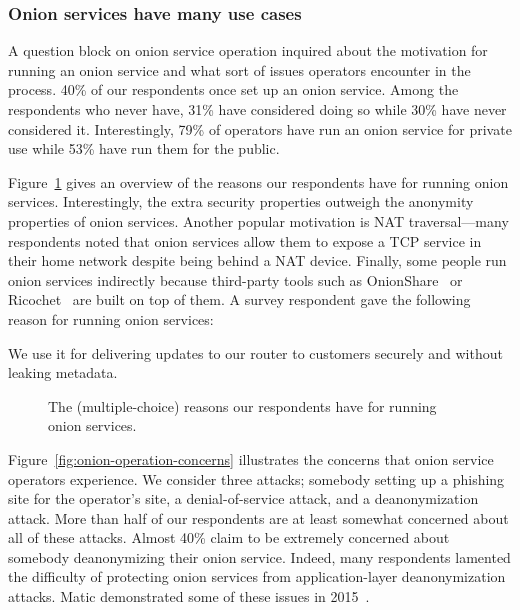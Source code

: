 \subsubsection{Onion services have many use cases}

A question block on onion service operation inquired about the motivation for
running an onion service and what sort of issues operators encounter in the
process.  40\% of our respondents once set up an onion service.  Among the
respondents who never have, 31\% have considered doing so while 30\% have never
considered it.  Interestingly, 79\% of operators have run an onion service for
private use while 53\% have run them for the public.

Figure~\ref{fig:onion-operation-reasons} gives an overview of the reasons our
respondents have for running onion services.  Interestingly, the extra security
properties outweigh the anonymity properties of onion services.  Another popular
motivation is NAT traversal---many respondents noted that onion services allow
them to expose a TCP service in their home network despite being behind a NAT
device.  Finally, some people run onion services indirectly because third-party
tools such as OnionShare~\cite{onionshare} or Ricochet~\cite{ricochet} are built
on top of them.  A survey respondent gave the following reason for running onion
services:

\begin{displayquote}
We use it for delivering updates to our router to customers securely and without
leaking metadata.
\end{displayquote}

\begin{figure}[t]
    \centering
    
    \caption{The (multiple-choice) reasons our respondents have for running
    onion services.}
    \label{fig:onion-operation-reasons}
\end{figure}

Figure~\ref{fig:onion-operation-concerns} illustrates the concerns that onion
service operators experience.  We consider three attacks; \first somebody
setting up a phishing site for the operator's site, \second a denial-of-service
attack, and \third a deanonymization attack.  More than half of our respondents
are at least somewhat concerned about all of these attacks.  Almost 40\% claim
to be extremely concerned about somebody deanonymizing their onion service.
Indeed, many respondents lamented the difficulty of protecting onion services
from application-layer deanonymization attacks.  Matic \ea demonstrated some of
these issues in 2015~\cite{Matic2015a}.

